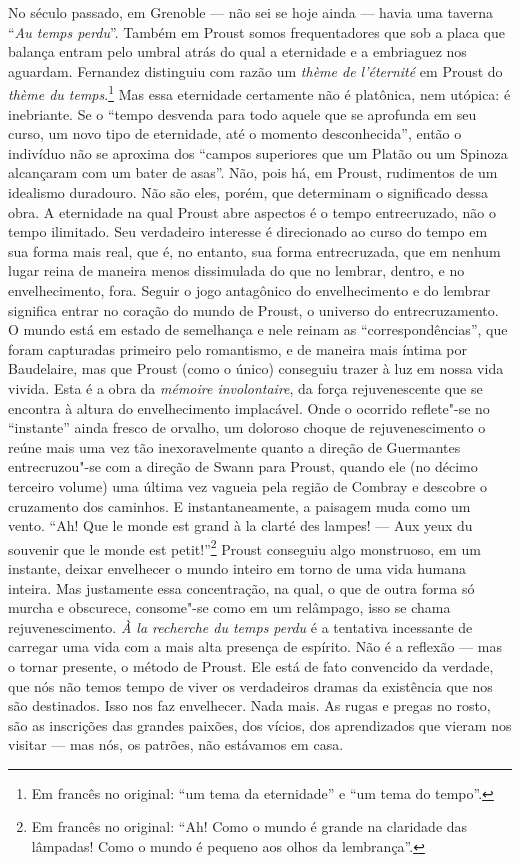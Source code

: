 No século passado, em Grenoble --- não sei se hoje ainda --- havia uma
taverna ``\emph{Au temps perdu}''. Também em Proust somos
frequentadores que sob a placa que balança entram pelo umbral atrás
do qual a eternidade e a embriaguez nos aguardam. Fernandez distinguiu
com razão um \emph{thème de l'éternité} em Proust do \emph{thème du
temps}.\footnote{Em francês no original: ``um tema da eternidade'' e ``um tema do tempo''. \versal{[N.~T.]}}
Mas essa eternidade certamente não é platônica, nem utópica: é
inebriante. Se o ``tempo desvenda para todo aquele que se aprofunda em
seu curso, um novo tipo de eternidade, até o momento desconhecida'',
então o indivíduo não se aproxima dos ``campos superiores que um Platão
ou um Spinoza alcançaram com um bater de asas''. Não, pois há, em Proust,
rudimentos de um idealismo duradouro. Não são eles, porém, que
determinam o significado dessa obra. A eternidade na qual Proust abre
aspectos é o tempo entrecruzado, não o tempo ilimitado. Seu verdadeiro
interesse é direcionado ao curso do tempo em sua forma mais real, que é,
no entanto, sua forma entrecruzada, que em nenhum lugar reina de maneira
menos dissimulada do que no lembrar, dentro, e no envelhecimento, fora.
Seguir o jogo antagônico do envelhecimento e do lembrar significa entrar
no coração do mundo de Proust, o universo do entrecruzamento. O mundo
está em estado de semelhança e nele reinam as ``correspondências'', que
foram capturadas primeiro pelo romantismo, e de maneira mais íntima por
Baudelaire, mas que Proust (como o único) conseguiu trazer à luz em
nossa vida vivida. Esta é a obra da \emph{mémoire involontaire}, da
força rejuvenescente que se encontra à altura do envelhecimento
implacável. Onde o ocorrido reflete"-se no ``instante'' ainda fresco de
orvalho, um doloroso choque de rejuvenescimento o reúne mais uma vez tão
inexoravelmente quanto a direção de Guermantes entrecruzou"-se com a
direção de Swann para Proust, quando ele (no décimo terceiro volume) uma
última vez vagueia pela região de Combray e descobre o cruzamento dos
caminhos. E instantaneamente, a paisagem muda como um vento. ``Ah! Que
le monde est grand à la clarté des lampes! --- Aux yeux du
souvenir que le monde est petit!''\footnote{Em francês no original: ``Ah! Como o mundo é
  grande na claridade das lâmpadas! Como o mundo é pequeno aos olhos da
  lembrança''. \versal{[N.~T.]}} Proust conseguiu algo monstruoso, em um instante, deixar
envelhecer o mundo inteiro em torno de uma vida humana inteira. Mas
justamente essa concentração, na qual, o que de outra forma só murcha e
obscurece, consome"-se como em um relâmpago, isso se chama
rejuvenescimento. \emph{À la recherche du temps perdu} é a tentativa
incessante de carregar uma vida com a mais alta presença de espírito.
Não é a reflexão --- mas o tornar presente, o método de Proust. Ele está
de fato convencido da verdade, que nós não temos tempo de viver os
verdadeiros dramas da existência que nos são destinados. Isso nos faz
envelhecer. Nada mais. As rugas e pregas no rosto, são as inscrições das
grandes paixões, dos vícios, dos aprendizados que vieram nos visitar ---
mas nós, os patrões, não estávamos em casa.

